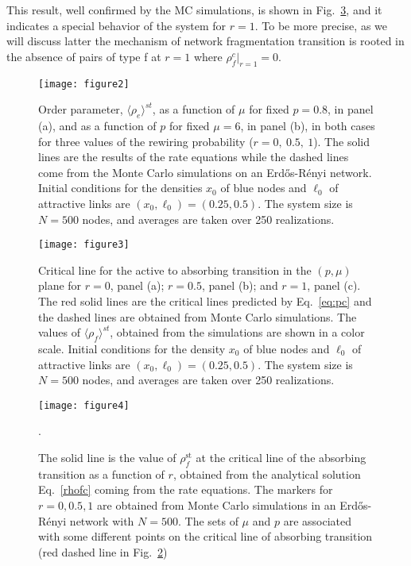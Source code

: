 \documentclass[aps,pre,notitlepage]{revtex4-1}
\begin{document}
This result, well confirmed by the MC simulations, is shown in Fig.~\ref{rho_f_r_c}, and it indicates a special behavior of the system for $r=1$. To be more precise, as we will discuss latter the mechanism of network fragmentation transition is rooted in the absence of pairs of type f at $r=1$ where $\rho_{f}^{c}\Big\rvert_{r=1}=0$.
\begin{figure}[]
\centering
\texttt{[image: figure2]}
\caption{Order parameter, $\langle\rho_{e}\rangle^{st}$, as a function of $\mu$ for fixed $p=0.8$, in panel (a), and as a function of $p$ for fixed $\mu=6$, in panel (b), in both cases for three values of the rewiring probability ($r=0, \ 0.5,\ 1$). The solid lines are the results of the rate equations while the dashed lines come from the Monte Carlo simulations on an Erd\H{o}s-R\'enyi network. Initial conditions for the densities $x_0$ of blue nodes and $\ell_0$ of attractive links are $(x_0,\ell_0)=(0.25,0.5)$. The system size is $N=500$ nodes, and averages are taken over 250 realizations.}
\label{cut_Ph_Di}
\end{figure}

\begin{figure}[]
 \centering
 \texttt{[image: figure3]}
\caption{Critical line for the active to absorbing transition in the $(p,\mu)$ plane for $r=0$, panel (a); $r=0.5$, panel (b); and $r=1$, panel (c). The red solid lines are the critical lines predicted by Eq.~\eqref{eq:pc} and the dashed lines are obtained from Monte Carlo simulations. The values of $\langle\rho_{f}\rangle^{st}$, obtained from the simulations are shown in a color scale. Initial conditions for the density $x_0$ of blue nodes and $\ell_0$ of attractive links are $(x_0,\ell_0)=(0.25,0.5)$. The system size is $N=500$ nodes, and averages are taken over 250 realizations.}
\label{rho_f_r}
\end{figure}
\begin{figure}[]
 \centering
 \texttt{[image: figure4]}
\caption{The solid line is the value of $\rho_{f}^\text{st}$ at the critical line of the absorbing transition as a function of $r$, obtained from the analytical solution Eq.~\eqref{rhofc} coming from the rate equations. The markers for $r=0,0.5,1$ are obtained from Monte Carlo simulations in an Erd\H{o}s-R\'enyi network with $N=500$. The sets of $\mu$ and $p$ are associated with some different points on the critical line of absorbing transition (red dashed line in Fig.~\ref{rho_f_r})}.
\label{rho_f_r_c}
\end{figure}
\end{document}

